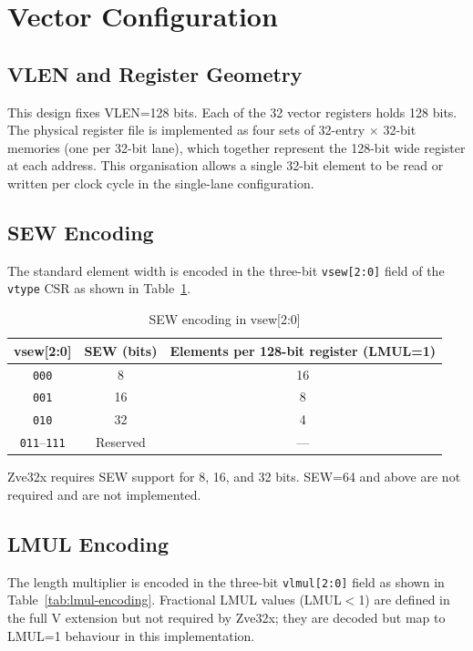 \section{Vector Configuration}
\label{sec:vec-config}

\subsection{VLEN and Register Geometry}

This design fixes VLEN=128 bits. Each of the 32 vector registers holds 128 bits.
The physical register file is implemented as four sets of 32-entry $\times$ 32-bit
memories (one per 32-bit lane), which together represent the 128-bit wide register
at each address. This organisation allows a single 32-bit element to be read or written
per clock cycle in the single-lane configuration.

\subsection{SEW Encoding}

The standard element width is encoded in the three-bit \texttt{vsew[2:0]} field of the
\texttt{vtype} CSR as shown in Table~\ref{tab:sew-encoding}.

\begin{table}[H]
  \centering
  \caption{SEW encoding in vsew[2:0]}
  \label{tab:sew-encoding}
  \begin{tabular}{@{}ccc@{}}
    \toprule
    \textbf{vsew[2:0]} & \textbf{SEW (bits)} & \textbf{Elements per 128-bit register (LMUL=1)} \\
    \midrule
    \texttt{000} & 8  & 16 \\
    \texttt{001} & 16 & 8  \\
    \texttt{010} & 32 & 4  \\
    \texttt{011}--\texttt{111} & Reserved & --- \\
    \bottomrule
  \end{tabular}
\end{table}

Zve32x requires SEW support for 8, 16, and 32 bits. SEW=64 and above are not required
and are not implemented.

\subsection{LMUL Encoding}

The length multiplier is encoded in the three-bit \texttt{vlmul[2:0]} field as shown
in Table~\ref{tab:lmul-encoding}. Fractional LMUL values (LMUL$<$1) are defined in
the full V extension but not required by Zve32x; they are decoded but map to LMUL=1
behaviour in this implementation.

